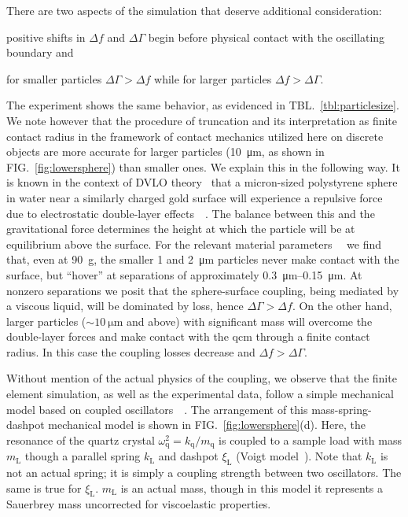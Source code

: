 \documentclass[floatfix,superscriptaddress,a4paper,twocolumn]{revtex4-1}
\newcommand{\Figure}[1]{FIG.~\ref{#1}}
\newcommand{\Table}[1]{TBL.~\ref{#1}}
\newcommand{\df}{\Delta\!f}
\newcommand{\dg}{\Delta\Gamma}
\newcommand{\xil}{\xi_\mathrm{L}}
\newcommand{\kl}{k_\mathrm{L}}
\newcommand{\ml}{m_\mathrm{L}}
\newcommand{\kq}{k_\mathrm{q}}
\newcommand{\mq}{m_\mathrm{q}}
\newcommand{\omegaq}{\omega_\mathrm{q}}
\begin{document}
There are two aspects of the simulation that deserve additional
consideration:
\begin{inparaenum}[(1)]
  \item positive shifts in $\df$ and $\dg$ begin
  before physical contact with the oscillating boundary and
  \item for smaller particles $\dg>\df$ while for
  larger particles $\df>\dg$.
\end{inparaenum}
The experiment shows the same behavior, as evidenced in
\Table{tbl:particlesize}.  We note however that the procedure of truncation
and its interpretation as finite contact radius in the framework of contact
mechanics utilized here on discrete objects are more accurate for larger
particles (\SI{10}{\micro\meter}, as shown in \Figure{fig:lowersphere})
than smaller ones.  We explain this in the following way.
It is known in
the context of DVLO theory~\cite{israelachvili2011intermolecular} that a
micron-sized polystyrene sphere in water near a similarly charged gold
surface will experience a repulsive force due to electrostatic double-layer
effects~\cite{alexander1987hydrodynamic}~\cite{flicker1993quantifying}.
The balance between this and the gravitational force determines the height
at which the particle will be at equilibrium above the surface.  For the
relevant material
parameters~\cite{israelachvili2011intermolecular}~\cite{sharma1992factors}
we find that, even at \SI{90}{g}, the smaller \num{1} and
\SI{2}{\micro\meter} particles never make contact with the surface, but
``hover'' at separations of approximately
\SIrange{0.3}{0.15}{\micro\meter}.  At nonzero separations we posit that
the sphere-surface coupling, being mediated by a viscous liquid, will be
dominated by loss, hence $\dg>\df$.  On the other hand, larger particles
($\sim\SI{10}{\micro\meter}$ and above) with significant mass will overcome
the double-layer forces and make contact with the \gls{qcm} through a finite
contact radius.  In this case the coupling losses decrease and $\df>\dg$.

Without mention of the actual physics of the coupling, we observe that the
finite element simulation, as well as the experimental data, follow a simple
mechanical model based on coupled
oscillators~\cite{dybwad1985sensitive}~\cite{olsson2012probing}.  The
arrangement of this mass-spring-dashpot mechanical model is shown in
\Figure{fig:lowersphere}(d).  Here, the resonance of the quartz crystal
$\omegaq^2=\kq/\mq$ is coupled to a sample load with mass $\ml$ though a
parallel spring $\kl$ and dashpot $\xil$ (Voigt
model~\cite{sips1950mechanical}).  Note that $\kl$ is not an actual spring; it
is simply a coupling strength between two oscillators.  The same is true for
$\xil$.  $\ml$ is an actual mass, though in this model it represents a
Sauerbrey mass uncorrected for viscoelastic properties.
\end{document}
